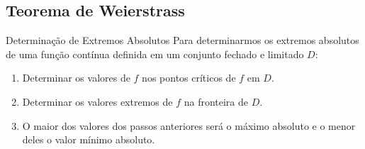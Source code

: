 \subsection*{Teorema de Weierstrass}
\begin{frame}[label=otimizacao]

\begin{exampleblock}{Determinação de Extremos Absolutos}
Para determinarmos os extremos absolutos de uma {\color{red}função contínua} definida em um {\color{red}conjunto fechado e limitado} $D$:
\begin{enumerate}
\item Determinar os valores de $f$ nos pontos críticos de $f$ em $D$.
\item Determinar os valores extremos de $f$ na fronteira de $D$.
\item O maior dos valores dos passos anteriores será o máximo absoluto e o menor deles o valor mínimo absoluto.
\end{enumerate}
\end{exampleblock}
\end{frame}

